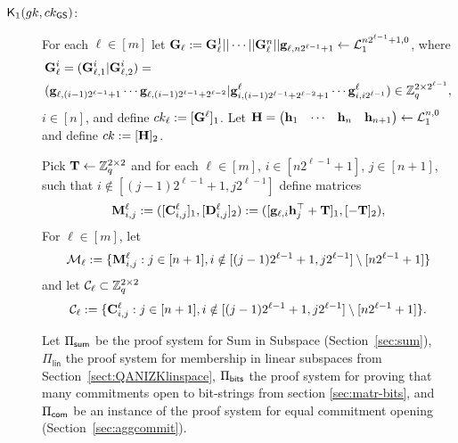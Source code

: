 \begin{description}

\item[{\(\mathsf{K}_1({gk}, ck_{\mathsf{GS}})\)}:]
For each \(\ell\in [m]\) let \(\mathbf{{G}}_\ell:=\mathbf{{G}}^1_{\ell}||\cdots||\mathbf{{G}}^n_{\ell}||\mathbf{g}_{\ell,{n2^{\ell-1}+1}}\gets\mathcal{L}_1^{n2^{\ell-1}+1,0}\), where
\begin{align*}
&\mathbf{{G}}^i_{\ell}=
(\mathbf{{G}}^i_{\ell,1}|\mathbf{{G}}^i_{\ell,2})
=\\
&(\mathbf{g}_{\ell,(i-1)2^{\ell-1}+1}\cdots\mathbf{g}_{\ell, (i-1) 2^{\ell-1}+2^{\ell-2}}|\mathbf{g}^\ell_{i,(i-1)2^{\ell-1}+2^{\ell-2}+1}\cdots\mathbf{g}^\ell_{i,i2^{\ell-1}})
\in\mathbb{Z}_q^{2\times 2^{\ell-1}},
\end{align*}
 \(i\in  [n]\), and define \(ck_\ell:=[\mathbf{{G}}^\ell]_1\).
Let \(\mathbf{{H}}=\begin{pmatrix}\mathbf{h}_1&\cdots&\mathbf{h}_n&\mathbf{h}_{n+1}\end{pmatrix}\gets\mathcal{L}_1^{n,0}\) and define \(ck:=[\mathbf{{H}}]_2\). 

Pick \(\mathbf{{T}}\gets\mathbb{Z}_q^{2\times 2}\) and for each \(\ell\in[m]\), \( i\in [n2^{\ell-1}+1]\), \(j\in  [n+1]\), such that \(i\notin [(j-1)2^{\ell-1}+1,j2^{\ell-1}]\) define matrices
\[\mathbf{{M}}^\ell_{i,j}:=([\mathbf{{C}}_{i,j}^\ell]_1,[\mathbf{{D}}_{i,j}^\ell]_2):=([\mathbf{g}_{\ell,i}\mathbf{h}_j^{\top}+\mathbf{{T}}]_1,[-\mathbf{{T}}]_2),\]
For \(\ell\in [m]\), let
$$
\mathcal{M}_\ell:=\{\mathbf{{M}}^\ell_{i,j}:j\in[n+1],i\notin[(j-1)2^{\ell-1}+1,j2^{\ell-1}]\setminus[n2^{\ell-1}+1]\}$$
and let \(\mathcal{C}_\ell\subset\mathbb{Z}_q^{2\times 2}\)
$$
\mathcal{C}_\ell:=\{\mathbf{{C}}^\ell_{i,j}:j\in[n+1],i\notin[(j-1)2^{\ell-1}+1,j2^{\ell-1}]\setminus[n2^{\ell-1}+1]\}.
$$

Let \(\Pi_{\mathsf{sum}}\) be the proof system for Sum in Subspace 
(Section~\ref{sec:sum}), \(\Pi_\mathsf{lin}\) the proof system for membership in linear subspaces from Section~\ref{sect:QANIZKlinspace}, \(\Pi_{\mathsf{bits}}\) the proof system for proving that many commitments open to bit-strings from section \ref{sec:matr-bits}, and \(\Pi_{\mathsf{com}}\)
be an instance of the proof system for equal commitment opening (Section~\ref{sec:aggcommit}).


\end{description}
